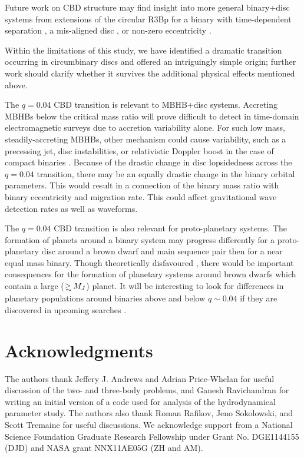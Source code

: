 \documentclass[usenatbib]{mnras}
\newcommand\gsim{\mathrel{\rlap{\lower4pt\hbox{\hskip1pt$\sim$}}
        \raise1pt\hbox{$>$}}}
\begin{document}
Future work on CBD structure may find insight into more general
binary+disc systems from extensions of the circular R3Bp for a binary
with time-dependent separation \citep{SchnitL4L5:2010}, a mis-aligned
disc \citep{ErwinSparke:1999}, or non-zero eccentricity
\citep{PSA:2005}.

Within the limitations of this study, we have identified a dramatic
transition occurring in circumbinary discs and offered an intriguingly
simple origin; further work should clarify whether it survives the
additional physical effects mentioned above.

The $q=0.04$ CBD transition is relevant to MBHB+disc
systems. Accreting MBHBs below the critical mass ratio will prove
difficult to detect in time-domain electromagnetic surveys due to
accretion variability alone. For such low mass, steadily-accreting
MBHBs, other mechanism could cause variability, such as a precessing
jet, disc instabilities, or relativistic Doppler boost in the case of
compact binaries \citep{PG1302Nature:2015b}.  Because of the drastic
change in disc lopsidedness across the $q=0.04$ transition, there may
be an equally drastic change in the binary orbital parameters. This
would result in a connection of the binary mass ratio with binary
eccentricity and migration rate. This could affect gravitational wave
detection rates as well as waveforms.

The $q=0.04$ CBD transition is also relevant for proto-planetary
systems. The formation of planets around a binary system may progress
differently for a proto-planetary disc around a brown dwarf and main
sequence pair \citep[\textit{e.g},][]{q0p02MSBD:2014,
  StellMassRatDist:2015, 7StellarEMRs:2015} then for a near equal mass
binary. Though theoretically disfavoured \citep{PayneLodato:2007},
there would be important consequences for the formation of planetary
systems around brown dwarfs which contain a large ($\gsim M_J$)
planet. It will be interesting to look for differences in planetary
populations around binaries above and below $q\sim 0.04$ if they are
discovered in upcoming searches \citep[\textit{e.g.}][]{Triaud:2013,
  TESS:2014}.


\section*{Acknowledgments}
The authors thank Jeffery J. Andrews and Adrian Price-Whelan for
useful discussion of the two- and three-body problems, and Ganesh
Ravichandran for writing an initial version of a code used for
analysis of the hydrodynamical parameter study. The authors also thank
Roman Rafikov, Jeno Sokolowski, and Scott Tremaine for useful
discussions. We acknowledge support from a National Science Foundation
Graduate Research Fellowship under Grant No. DGE1144155 (DJD) and NASA
grant NNX11AE05G (ZH and AM).
\end{document}
